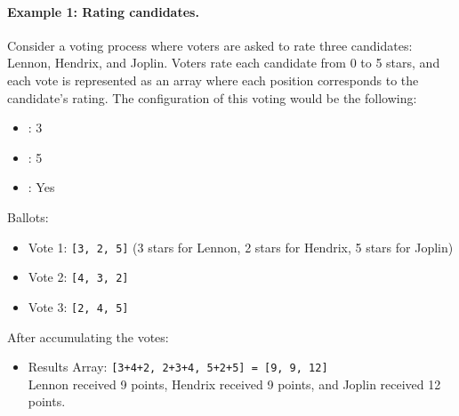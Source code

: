 
\begin{figure}[H]
	\centering
\end{figure}


\paragraph{Example 1: Rating candidates.}


Consider a voting process where voters are asked to rate three candidates: Lennon, Hendrix, and Joplin. Voters rate each candidate from 0 to 5 stars, and each vote is represented as an array where each position corresponds to the candidate’s rating. The configuration of this voting would be the following:

\begin{itemize}
	\item \maxcount: 3
	\item \maxvalue: 5
	\item \uniquevalues: Yes
\end{itemize}

Ballots:

\begin{itemize}
	\item Vote 1: \texttt{[3, 2, 5]} (3 stars for Lennon, 2 stars for Hendrix, 5 stars for Joplin)
	\item Vote 2: \texttt{[4, 3, 2]}
	\item Vote 3: \texttt{[2, 4, 5]}
\end{itemize}


After accumulating the votes:

\begin{itemize}
	\item Results Array: \texttt{[3+4+2, 2+3+4, 5+2+5] = [9, 9, 12]}\\
	Lennon received 9 points, Hendrix received 9 points, and Joplin received 12 points.
\end{itemize}

